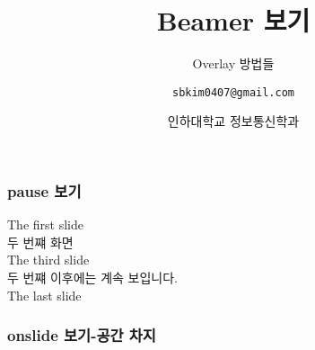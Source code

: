 \documentclass{beamer}
\title{Beamer 보기}
\subtitle{Overlay 방법들}
\author[Cheng-Bin Jin]{\texttt{sbkim0407@gmail.com}}
\date[\today]{인하대학교 정보통신학과}
\institute{컴퓨터비젼 연구실}
\begin{document}
\begin{frame}
\titlepage
\end{frame}

\begin{frame}
\frametitle{pause 보기}
The first slide \\
\pause
두 번쨰 화면 \\
\pause
The third slide \\
\pause[2]
두 번쨰 이후에는 계속 보입니다. \\
\pause
The last slide \\
\end{frame}

\begin{frame}
\frametitle{onslide 보기-공간 차지}
\end{frame}
\end{document}
